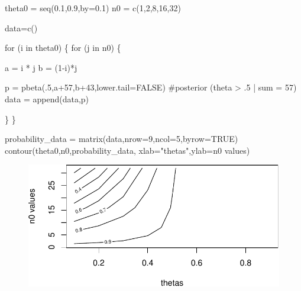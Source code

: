 \documentclass[
  letterpaper,
  DIV=11,
  numbers=noendperiod]{scrartcl}
\newenvironment{Shaded}{\begin{snugshade}}{\end{snugshade}}
\newcommand{\AttributeTok}[1]{\textcolor[rgb]{0.40,0.45,0.13}{#1}}
\newcommand{\CommentTok}[1]{\textcolor[rgb]{0.37,0.37,0.37}{#1}}
\newcommand{\ConstantTok}[1]{\textcolor[rgb]{0.56,0.35,0.01}{#1}}
\newcommand{\ControlFlowTok}[1]{\textcolor[rgb]{0.00,0.23,0.31}{#1}}
\newcommand{\DecValTok}[1]{\textcolor[rgb]{0.68,0.00,0.00}{#1}}
\newcommand{\FloatTok}[1]{\textcolor[rgb]{0.68,0.00,0.00}{#1}}
\newcommand{\FunctionTok}[1]{\textcolor[rgb]{0.28,0.35,0.67}{#1}}
\newcommand{\NormalTok}[1]{\textcolor[rgb]{0.00,0.23,0.31}{#1}}
\newcommand{\OtherTok}[1]{\textcolor[rgb]{0.00,0.23,0.31}{#1}}
\newcommand{\SpecialCharTok}[1]{\textcolor[rgb]{0.37,0.37,0.37}{#1}}
\newcommand{\StringTok}[1]{\textcolor[rgb]{0.13,0.47,0.30}{#1}}
\begin{document}
\begin{Shaded}
\begin{Highlighting}[]
\NormalTok{theta0 }\OtherTok{=} \FunctionTok{seq}\NormalTok{(}\FloatTok{0.1}\NormalTok{,}\FloatTok{0.9}\NormalTok{,}\AttributeTok{by=}\FloatTok{0.1}\NormalTok{)}
\NormalTok{n0 }\OtherTok{=} \FunctionTok{c}\NormalTok{(}\DecValTok{1}\NormalTok{,}\DecValTok{2}\NormalTok{,}\DecValTok{8}\NormalTok{,}\DecValTok{16}\NormalTok{,}\DecValTok{32}\NormalTok{)}

\NormalTok{data}\OtherTok{=}\FunctionTok{c}\NormalTok{()}

\ControlFlowTok{for}\NormalTok{ (i }\ControlFlowTok{in}\NormalTok{ theta0) \{}
\ControlFlowTok{for}\NormalTok{ (j }\ControlFlowTok{in}\NormalTok{ n0) \{}
  
\NormalTok{    a }\OtherTok{=}\NormalTok{ i }\SpecialCharTok{*}\NormalTok{ j}
\NormalTok{    b }\OtherTok{=}\NormalTok{ (}\DecValTok{1}\SpecialCharTok{{-}}\NormalTok{i)}\SpecialCharTok{*}\NormalTok{j}

\NormalTok{    p }\OtherTok{=} \FunctionTok{pbeta}\NormalTok{(.}\DecValTok{5}\NormalTok{,a}\SpecialCharTok{+}\DecValTok{57}\NormalTok{,b}\SpecialCharTok{+}\DecValTok{43}\NormalTok{,}\AttributeTok{lower.tail=}\ConstantTok{FALSE}\NormalTok{) }\CommentTok{\#posterior (theta \textgreater{} .5 | sum = 57)}
\NormalTok{    data }\OtherTok{=} \FunctionTok{append}\NormalTok{(data,p)}

\NormalTok{\}}
\NormalTok{\}}

\NormalTok{probability\_data }\OtherTok{=} \FunctionTok{matrix}\NormalTok{(data,}\AttributeTok{nrow=}\DecValTok{9}\NormalTok{,}\AttributeTok{ncol=}\DecValTok{5}\NormalTok{,}\AttributeTok{byrow=}\ConstantTok{TRUE}\NormalTok{)}
\FunctionTok{contour}\NormalTok{(theta0,n0,probability\_data, }\AttributeTok{xlab=}\StringTok{"thetas"}\NormalTok{,}\AttributeTok{ylab=}\StringTok{\textquotesingle{}n0 values\textquotesingle{}}\NormalTok{)}
\end{Highlighting}
\end{Shaded}

\begin{figure}[H]

{\centering \includegraphics{hw2_602_files/figure-pdf/unnamed-chunk-5-1.pdf}

}

\end{figure}
\end{document}
